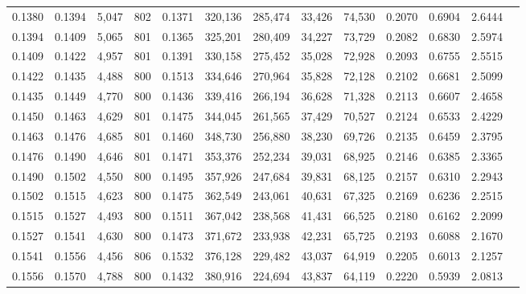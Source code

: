 \begin{tabular}{rrrrrrrrrrrrr}
0.1380 & 0.1394 &  5,047 & 802 &                                     0.1371 & 320,136 & 285,474 &  33,426 &  74,530 & 0.2070 & 0.6904 & 2.6444 \\
0.1394 & 0.1409 &  5,065 & 801 &                                     0.1365 & 325,201 & 280,409 &  34,227 &  73,729 & 0.2082 & 0.6830 & 2.5974 \\
0.1409 & 0.1422 &  4,957 & 801 &                                     0.1391 & 330,158 & 275,452 &  35,028 &  72,928 & 0.2093 & 0.6755 & 2.5515 \\
0.1422 & 0.1435 &  4,488 & 800 &                                     0.1513 & 334,646 & 270,964 &  35,828 &  72,128 & 0.2102 & 0.6681 & 2.5099 \\
0.1435 & 0.1449 &  4,770 & 800 &                                     0.1436 & 339,416 & 266,194 &  36,628 &  71,328 & 0.2113 & 0.6607 & 2.4658 \\
0.1450 & 0.1463 &  4,629 & 801 &                                     0.1475 & 344,045 & 261,565 &  37,429 &  70,527 & 0.2124 & 0.6533 & 2.4229 \\
0.1463 & 0.1476 &  4,685 & 801 &                                     0.1460 & 348,730 & 256,880 &  38,230 &  69,726 & 0.2135 & 0.6459 & 2.3795 \\
0.1476 & 0.1490 &  4,646 & 801 &                                     0.1471 & 353,376 & 252,234 &  39,031 &  68,925 & 0.2146 & 0.6385 & 2.3365 \\
0.1490 & 0.1502 &  4,550 & 800 &                                     0.1495 & 357,926 & 247,684 &  39,831 &  68,125 & 0.2157 & 0.6310 & 2.2943 \\
0.1502 & 0.1515 &  4,623 & 800 &                                     0.1475 & 362,549 & 243,061 &  40,631 &  67,325 & 0.2169 & 0.6236 & 2.2515 \\
0.1515 & 0.1527 &  4,493 & 800 &                                     0.1511 & 367,042 & 238,568 &  41,431 &  66,525 & 0.2180 & 0.6162 & 2.2099 \\
0.1527 & 0.1541 &  4,630 & 800 &                                     0.1473 & 371,672 & 233,938 &  42,231 &  65,725 & 0.2193 & 0.6088 & 2.1670 \\
0.1541 & 0.1556 &  4,456 & 806 &                                     0.1532 & 376,128 & 229,482 &  43,037 &  64,919 & 0.2205 & 0.6013 & 2.1257 \\
0.1556 & 0.1570 &  4,788 & 800 &                                     0.1432 & 380,916 & 224,694 &  43,837 &  64,119 & 0.2220 & 0.5939 & 2.0813 \\

\end{tabular}
